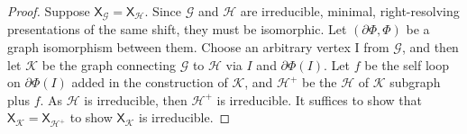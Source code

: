 \documentclass[hidelinks]{article}
\newcommand{\Gc}{\mathcal{G}}  %
\newcommand{\Hc}{\mathcal{H}}  %
\newcommand{\Bc}{\mathcal{B}}
\newcommand{\Kc}{\mathcal{K}}
\newcommand{\shift}[1]{\mathsf{X}_{#1}}
\theoremstyle{definition}
\begin{document}
    \begin{proof}
        Suppose \(\shift{\Gc} = \shift{\Hc}\). Since \(\Gc\) and \(\Hc\) are irreducible,
        minimal, right-resolving presentations of the same shift, they must be 
        isomorphic. Let \((\partial\Phi, \Phi)\) be a graph isomorphism between them. 
        Choose an arbitrary vertex I from \(\Gc\), and then let \(\Kc\) 
        be the graph connecting \(\Gc\) to \(\Hc\) via \(I\) and \(\partial\Phi(I)\).
        Let \(f\) be the self loop on \(\partial\Phi(I)\) added in the construction of
        \(\Kc\), and \(\Hc^+\) be the \(\Hc\) of \(\Kc\) subgraph plus \(f\).
         As 
        \(\Hc\) is irreducible, then \(\Hc^+\) is irreducible. 
        It suffices to show that \(\shift{\Kc} = \shift{\Hc^+}\) to show \(\shift{\Kc}\) 
        is irreducible. 




\end{proof}
\end{document}
